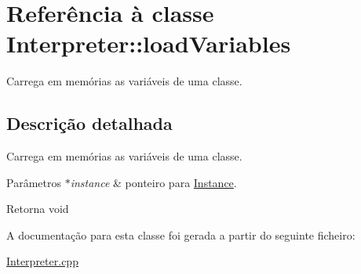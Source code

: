 \hypertarget{class_interpreter_1_1load_variables}{}\section{Referência à classe Interpreter\+:\+:load\+Variables}
\label{class_interpreter_1_1load_variables}


Carrega em memórias as variáveis de uma classe.  




\subsection{Descrição detalhada}
Carrega em memórias as variáveis de uma classe. 


\begin{DoxyParams}{Parâmetros}
{\em $\ast$instance} & ponteiro para \hyperlink{struct_instance}{Instance}. \\
\hline
\end{DoxyParams}
\begin{DoxyReturn}{Retorna}
void 
\end{DoxyReturn}


A documentação para esta classe foi gerada a partir do seguinte ficheiro\+:\begin{DoxyCompactItemize}
\item 
\hyperlink{_interpreter_8cpp}{Interpreter.\+cpp}\end{DoxyCompactItemize}
